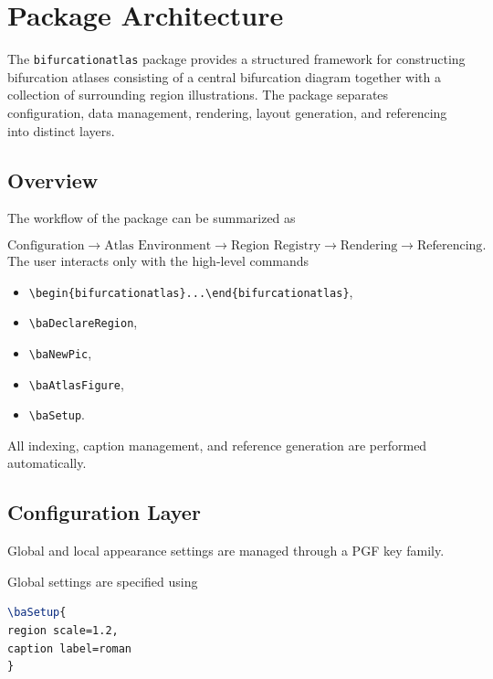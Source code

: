 \section{Package Architecture}

The \texttt{bifurcationatlas} package provides a structured framework for constructing bifurcation atlases consisting of a central bifurcation diagram together with a collection of surrounding region illustrations. The package separates configuration, data management, rendering, layout generation, and referencing into distinct layers.

\subsection{Overview}

The workflow of the package can be summarized as

\begin{equation*}
    \text{Configuration}
\rightarrow
\text{Atlas Environment}
\rightarrow
\text{Region Registry}
\rightarrow
\text{Rendering}
\rightarrow
\text{Referencing}.
\end{equation*}
The user interacts only with the high-level commands

\begin{itemize}
\item \lstinline|\begin{bifurcationatlas}...\end{bifurcationatlas}|,
\item \lstinline|\baDeclareRegion|,
\item \lstinline|\baNewPic|,
\item \lstinline|\baAtlasFigure|,
\item \lstinline|\baSetup|.
\end{itemize}

All indexing, caption management, and reference generation are performed automatically.

\subsection{Configuration Layer}

Global and local appearance settings are managed through a PGF key family.

Global settings are specified using

\begin{lstlisting}[language=LaTeX]
\baSetup{
region scale=1.2,
caption label=roman
}
\end{lstlisting}

